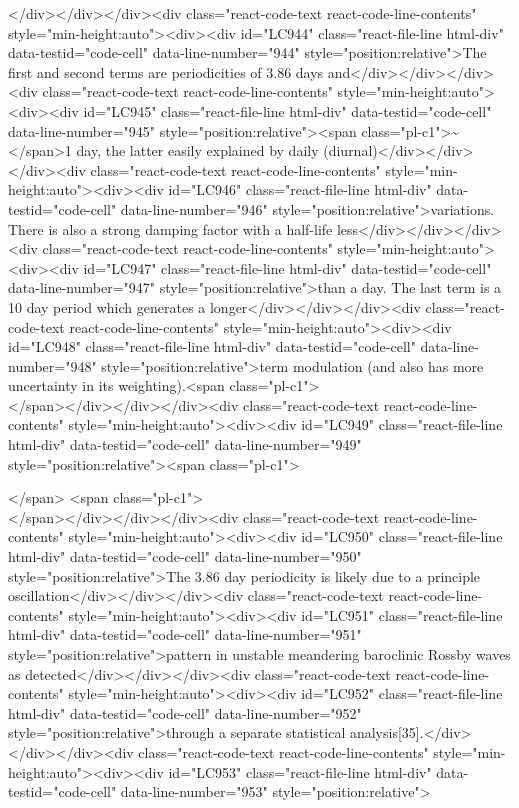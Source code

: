{{{{{{</div></div></div><div class="react-code-text react-code-line-contents" style="min-height:auto"><div><div id="LC944" class="react-file-line html-div" data-testid="code-cell" data-line-number="944" style="position:relative">The first and second terms are periodicities of 3.86 days and</div></div></div><div class="react-code-text react-code-line-contents" style="min-height:auto"><div><div id="LC945" class="react-file-line html-div" data-testid="code-cell" data-line-number="945" style="position:relative"><span class="pl-c1">\textasciitilde</span>1 day, the latter easily explained by daily (diurnal)</div></div></div><div class="react-code-text react-code-line-contents" style="min-height:auto"><div><div id="LC946" class="react-file-line html-div" data-testid="code-cell" data-line-number="946" style="position:relative">variations.~ There is also a strong damping factor with a half-life less</div></div></div><div class="react-code-text react-code-line-contents" style="min-height:auto"><div><div id="LC947" class="react-file-line html-div" data-testid="code-cell" data-line-number="947" style="position:relative">than a day. The last term is a 10 day period which generates a longer</div></div></div><div class="react-code-text react-code-line-contents" style="min-height:auto"><div><div id="LC948" class="react-file-line html-div" data-testid="code-cell" data-line-number="948" style="position:relative">term modulation (and also has more uncertainty in its weighting).<span class="pl-c1">\\</span></div></div></div><div class="react-code-text react-code-line-contents" style="min-height:auto"><div><div id="LC949" class="react-file-line html-div" data-testid="code-cell" data-line-number="949" style="position:relative"><span class="pl-c1">\strut</span> <span class="pl-c1">\\</span></div></div></div><div class="react-code-text react-code-line-contents" style="min-height:auto"><div><div id="LC950" class="react-file-line html-div" data-testid="code-cell" data-line-number="950" style="position:relative">The 3.86 day periodicity is likely due to a principle oscillation</div></div></div><div class="react-code-text react-code-line-contents" style="min-height:auto"><div><div id="LC951" class="react-file-line html-div" data-testid="code-cell" data-line-number="951" style="position:relative">pattern in unstable meandering baroclinic Rossby waves as detected</div></div></div><div class="react-code-text react-code-line-contents" style="min-height:auto"><div><div id="LC952" class="react-file-line html-div" data-testid="code-cell" data-line-number="952" style="position:relative">through a separate statistical analysis{[}35{]}.</div></div></div><div class="react-code-text react-code-line-contents" style="min-height:auto"><div><div id="LC953" class="react-file-line html-div" data-testid="code-cell" data-line-number="953" style="position:relative">
}}}}}}
